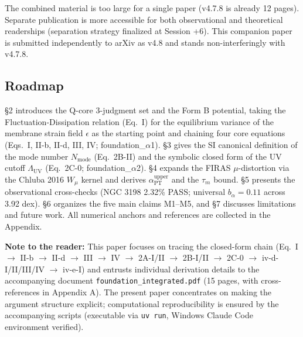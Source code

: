 \documentclass[11pt,a4paper]{article}
\newcommand{\Nmode}{N_{\mathrm{mode}}}
\newcommand{\aPT}{\alpha_{\mathrm{PT}}}
\newcommand{\taum}{\tau_{m}}
\newcommand{\bal}{b_{\alpha}}
\newcommand{\Wmu}{W_{\mu}}
\newcommand{\Lambdauv}{\Lambda_{\mathrm{UV}}}
\begin{document}
The combined material is too large for a single paper (v4.7.8 is already 12 pages). Separate
publication is more accessible for both observational and theoretical readerships (separation
strategy finalized at Session +6). This companion paper is submitted independently to arXiv as v4.8
and stands non-interferingly with v4.7.8.

\subsection{Roadmap}
\S 2 introduces the Q-core 3-judgment set and the Form B potential, taking the
Fluctuation-Dissipation relation (Eq.~I) for the equilibrium variance of the membrane strain field
$\epsilon$ as the starting point and chaining four core equations (Eqs.~I, II-b, II-d, III, IV;
foundation\_$\alpha$1).
\S 3 gives the SI canonical definition of the mode number $\Nmode$ (Eq.~2B-II) and the symbolic
closed form of the UV cutoff $\Lambdauv$ (Eq.~2C-0; foundation\_$\alpha$2).
\S 4 expands the FIRAS $\mu$-distortion via the Chluba 2016 $\Wmu$ kernel and derives
$\aPT^{\mathrm{upper}}$ and the $\taum$ bound.
\S 5 presents the observational cross-checks (NGC 3198 2.32\% PASS; universal $\bal = 0.11$ across
3.92 dex).
\S 6 organizes the five main claims M1--M5, and \S 7 discusses limitations and future work.
All numerical anchors and references are collected in the Appendix.

\begin{notebox}
\textbf{Note to the reader:}
This paper focuses on tracing the closed-form chain
(Eq.~I $\to$ II-b $\to$ II-d $\to$ III $\to$ IV $\to$ 2A-I/II $\to$ 2B-I/II $\to$ 2C-0 $\to$
iv-d-I/II/III/IV $\to$ iv-e-I)
and entrusts individual derivation details to the accompanying document
\texttt{foundation\_integrated.pdf} (15 pages, with cross-references in Appendix A).
The present paper concentrates on making the argument structure explicit; computational
reproducibility is ensured by the accompanying scripts (executable via \texttt{uv run},
Windows Claude Code environment verified).
\end{notebox}
\end{document}
